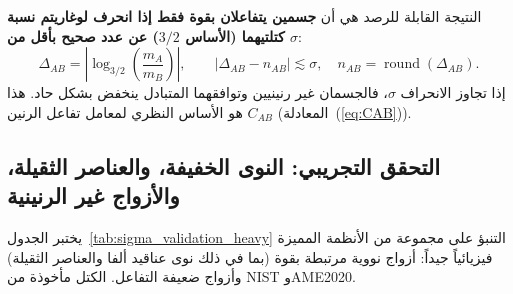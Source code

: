 \documentclass[12pt,a4paper]{article}
\begin{document}
	النتيجة القابلة للرصد هي أن \textbf{جسمين يتفاعلان بقوة فقط إذا انحرف لوغاريتم نسبة كتلتيهما (الأساس \(3/2\)) عن عدد صحيح بأقل من \(\sigma\)}:
	\begin{equation}
		\Delta_{AB} = \left| \log_{3/2}\!\left(\frac{m_A}{m_B}\right) \right|,\qquad |\Delta_{AB} - n_{AB}| \lesssim \sigma,\quad n_{AB} = \operatorname{round}(\Delta_{AB}).
	\end{equation}
	إذا تجاوز الانحراف \(\sigma\)، فالجسمان غير رنينيين وتوافقهما المتبادل ينخفض بشكل حاد. هذا هو الأساس النظري لمعامل تفاعل الرنين \(C_{AB}\) (المعادلة~(\ref{eq:CAB})).
	
	\subsection{التحقق التجريبي: النوى الخفيفة، والعناصر الثقيلة، والأزواج غير الرنينية}
	
	يختبر الجدول~\ref{tab:sigma_validation_heavy} التنبؤ على مجموعة من الأنظمة المميزة فيزيائياً جيداً: أزواج نووية مرتبطة بقوة (بما في ذلك نوى عناقيد ألفا والعناصر الثقيلة) وأزواج ضعيفة التفاعل. الكتل مأخوذة من NIST وAME2020.
	
\end{document}
